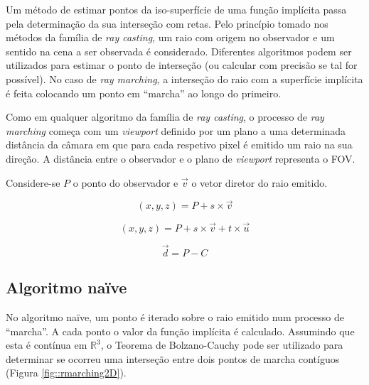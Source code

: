 Um método de estimar pontos da iso-superfície de uma função implícita passa pela determinação da sua interseção com retas. Pelo princípio tomado nos métodos da família de \textit{ray casting}, um raio com origem no observador e um sentido na cena a ser observada é considerado. Diferentes algoritmos podem ser utilizados para estimar o ponto de interseção (ou calcular com precisão se tal for possível). No caso de \textit{ray marching}, a interseção do raio com a superfície implícita é feita colocando um ponto em ``marcha'' ao longo do primeiro.


Como em qualquer algoritmo da família de \textit{ray casting}, o processo de \textit{ray marching} começa com um \textit{viewport} definido por um plano a uma determinada distância da câmara em que para cada respetivo pixel é emitido um raio na sua direção. A distância entre o observador e o plano de \textit{viewport} representa o \ac{FOV}.

Considere-se $P$ o ponto do observador e $\overrightarrow{v}$ o vetor diretor do raio emitido. 


\begin{equation}
    (x, y, z) = P + s \times \overrightarrow{v}
\end{equation}

\begin{equation}
    (x, y, z) = P + s \times \overrightarrow{v} + t \times \overrightarrow{u}
\end{equation}

\begin{equation}
    \overrightarrow{d} = P - C
\end{equation}


\subsection{Algoritmo naïve}
\label{ssec::art:raymarch:naive}


No algoritmo naïve, um ponto é iterado sobre o raio emitido num processo de ``marcha''. A cada ponto o valor da função implícita é calculado. Assumindo que esta é contínua em $\mathbb{R}^3$, o Teorema de Bolzano-Cauchy pode ser utilizado para determinar se ocorreu uma interseção entre dois pontos de marcha contíguos (Figura \ref{fig::rmarching2D}).

